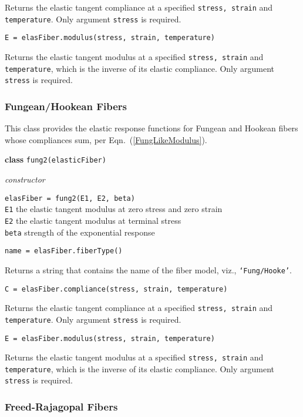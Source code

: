 \medskip\noindent
Returns the elastic tangent compliance at a specified \texttt{stress, strain} and \texttt{temperature}.  Only argument \texttt{stress} is required.

\medskip\noindent
\texttt{E = elasFiber.modulus(stress, strain, temperature)}

\medskip\noindent
Returns the elastic tangent modulus at a specified \texttt{stress, strain} and \texttt{temperature}, which is the inverse of its elastic compliance.  Only argument \texttt{stress} is required.


\subsubsection{Fungean\slash Hookean Fibers}

This class provides the elastic response functions for Fungean and Hookean fibers whose compliances sum, per Eqn.~(\ref{FungLikeModulus}).

\bigskip\noindent
\textbf{class} \texttt{fung2(elasticFiber)}

\medskip\noindent
\textit{constructor}

\medskip\noindent
\texttt{elasFiber = fung2(E1, E2, beta)} \\
\indent \texttt{E1} \quad\: the elastic tangent modulus at zero stress and zero strain \\
\indent \texttt{E2} \quad\: the elastic tangent modulus at terminal stress \\
\indent \texttt{beta} \: strength of the exponential response

\newpage
\bigskip\noindent
\texttt{name = elasFiber.fiberType()}

\medskip\noindent
Returns a string that contains the name of the fiber model, viz., \texttt{`Fung/Hooke'}.

\medskip\noindent
\texttt{C = elasFiber.compliance(stress, strain, temperature)}

\medskip\noindent
Returns the elastic tangent compliance at a specified \texttt{stress, strain} and \texttt{temperature}.  Only argument \texttt{stress} is required.

\medskip\noindent
\texttt{E = elasFiber.modulus(stress, strain, temperature)}

\medskip\noindent
Returns the elastic tangent modulus at a specified \texttt{stress, strain} and \texttt{temperature}, which is the inverse of its elastic compliance.  Only argument \texttt{stress} is required.


\subsubsection{Freed-Rajagopal Fibers}


